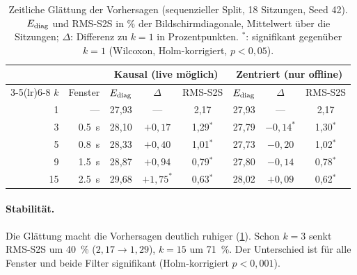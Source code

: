 \begin{table}[htbp]
  \centering
  \caption[Zeitliche Glättung der Vorhersagen]{Zeitliche Glättung der Vorhersagen (sequenzieller Split,
           18 Sitzungen, Seed 42). $E_{\mathrm{diag}}$ und RMS-S2S in \si{\percent} der
           Bildschirmdiagonale, Mittelwert über die Sitzungen; $\Delta$:
           Differenz zu $k=1$ in Prozentpunkten. $^{*}$: signifikant gegenüber
           $k=1$ (Wilcoxon, Holm-korrigiert, $p<0,05$).}
  \label{tab:smoothing}
  \small
  \begin{tabular}{rr ccc ccc}
    \toprule
    & & \multicolumn{3}{c}{Kausal (live möglich)} & \multicolumn{3}{c}{Zentriert (nur offline)} \\
    \cmidrule(lr){3-5}\cmidrule(lr){6-8}
    $k$ & Fenster & $E_{\mathrm{diag}}$ & $\Delta$ & RMS-S2S & $E_{\mathrm{diag}}$ & $\Delta$ & RMS-S2S \\
    \midrule
    1  & ---               & 27,93 & ---               & 2,17          & 27,93 & ---               & 2,17 \\
    3  & \SI{0,5}{\second} & 28,10 & $+0,17$           & 1,29$^{*}$    & 27,79 & $-0,14^{*}$       & 1,30$^{*}$ \\
    5  & \SI{0,8}{\second} & 28,33 & $+0,40$           & 1,01$^{*}$    & 27,73 & $-0,20$           & 1,02$^{*}$ \\
    9  & \SI{1,5}{\second} & 28,87 & $+0,94$           & 0,79$^{*}$    & 27,80 & $-0,14$           & 0,78$^{*}$ \\
    15 & \SI{2,5}{\second} & 29,68 & $+1,75^{*}$       & 0,63$^{*}$    & 28,02 & $+0,09$           & 0,62$^{*}$ \\
    \bottomrule
  \end{tabular}
\end{table}

\paragraph{Stabilität.} Die Glättung macht die Vorhersagen deutlich ruhiger
(\cref{tab:smoothing}). Schon $k=3$ senkt RMS-S2S um \SI{40}{\percent}
($2,17 \rightarrow 1,29$), $k=15$ um \SI{71}{\percent}. Der Unterschied ist für
alle Fenster und beide Filter signifikant (Holm-korrigiert $p<0,001$).

